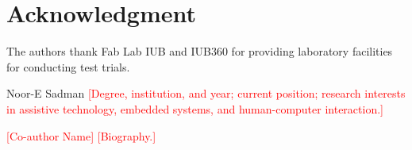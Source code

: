 \documentclass[journal]{IEEEtran}
\newcommand{\tbd}[1]{\textcolor{red}{[#1]}}
\begin{document}
\section*{Acknowledgment}
The authors thank Fab Lab IUB and IUB360 for providing laboratory facilities for conducting test trials.




\begin{IEEEbiographynophoto}{Noor-E Sadman}
\tbd{Degree, institution, and year; current position; research interests in assistive technology, embedded systems, and human-computer interaction.}
\end{IEEEbiographynophoto}

\begin{IEEEbiographynophoto}{\tbd{Co-author Name}}
\tbd{Biography.}
\end{IEEEbiographynophoto}
\end{document}
